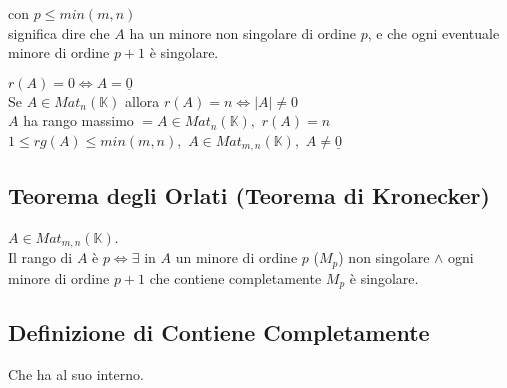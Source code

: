 \documentclass[a4paper, twoside, italian, 11pt]{book}
\newcommand{\detm}[1] {\left | #1 \right |}
\newcommand{\K}{\mathbb K}
\begin{document}
\noindent
con $p \leq min(m, n)$ \\

\noindent
significa dire che $A$ ha un minore non singolare di ordine $p$, e che ogni eventuale minore di ordine $p + 1$ è singolare.

\noindent
$r(A) = 0 \iff A = \underline{0}$ \\

\noindent
Se $A \in Mat_n(\K)$ allora $r(A) = n \iff \detm A \neq 0$ \\

\noindent
$A$ ha rango massimo $= A \in Mat_n(\K),$ $r(A) = n$ \\

\noindent
$1 \leq rg(A) \leq min(m,n),$ $A \in Mat_{m,n}(\K),$ $A \neq \underline{0}$


\subsection{Teorema degli Orlati (Teorema di Kronecker)}

$A \in Mat_{m,n}(\K)$.\\
Il rango di $A$ è $p \iff \exists$ in $A$ un minore di ordine $p$ ($M_p$) non singolare $\land$ ogni minore di ordine $p + 1$ che contiene completamente $M_p$ è singolare.


\subsection{Definizione di Contiene Completamente}
Che ha al suo interno.
\end{document}
